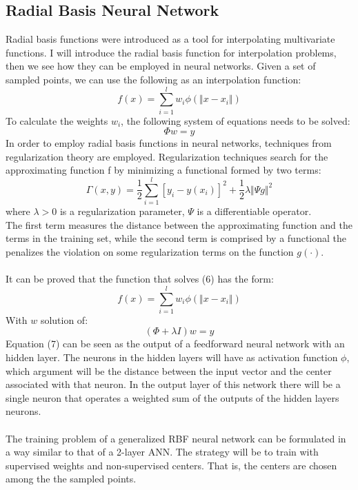 \documentclass[11pt,a4paper,oneside,titlepage,openright]{book}
\begin{document}
\subsection*{Radial Basis Neural Network}
Radial basis functions were introduced as a tool for interpolating multivariate functions. I will introduce the radial basis function for interpolation problems, then we see how they can be employed in neural networks. 
Given a set of sampled points, we can use the following as an interpolation function:
$$ f(x) = \sum_{i=1}^l w_i \phi(\Vert x - x_i \Vert)$$
To calculate the weights $w_i$, the following system of equations needs to be solved: 
$$\Phi w = y $$
In order to employ radial basis functions in neural networks, techniques from regularization theory are employed. 
Regularization techniques search for the approximating function f by minimizing a functional formed by two terms:
\begin{equation}
\Gamma(x,y) = \frac{1}{2}\sum_{i=1}^l[y_i - y(x_i)]^2 +\frac{1}{2}\lambda\Vert \Psi g \Vert^2
\end{equation}
where $\lambda > 0$ is a regularization parameter, $\Psi$ is a differentiable operator. \\
The first term measures the distance between the approximating function and the terms in the training set, while the second term is comprised by a functional the penalizes the violation on some regularization terms on the function $g(\cdot)$.\\\\
It can be proved that the function that solves (6) has the form: 
\begin{equation}
 f(x) = \sum_{i=1}^l w_i \phi(\Vert x - x_i \Vert)
\end{equation}With $w$ solution of: 
$$ (\Phi + \lambda I )w = y $$
Equation (7) can be seen as the output of a feedforward neural network with an hidden layer.
The neurons in the hidden layers will have as activation function $\phi$, which argument will be the distance between the input vector and the center associated with that neuron. In the output layer of this network there will be a single neuron that operates a weighted sum of the outputs of the hidden layers neurons.\\\\
The training problem of a generalized RBF neural network can be formulated in a way similar to that of a 2-layer ANN. The strategy will be to train with supervised weights and non-supervised centers. That is, the centers are chosen among the the sampled points. 
\end{document}
